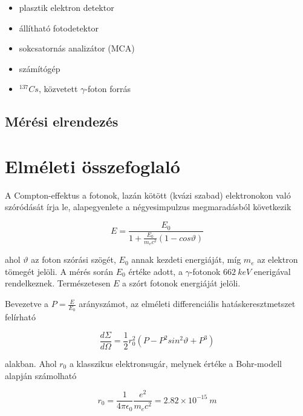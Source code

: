 \documentclass[a4paper,12pt]{article}
\begin{document}
\begin{itemize}
\item plasztik elektron detektor
\item állítható fotodetektor
\item sokcsatornás analizátor (MCA)
\item számítógép
\item $^{137}Cs$, közvetett $\gamma$-foton forrás
\end{itemize}

\subsection{Mérési elrendezés}



\vspace{2cm}

\section{Elméleti összefoglaló}

\par A Compton-effektus a fotonok, lazán kötött (kvázi szabad) elektronokon való szóródását írja le, alapegyenlete a négyesimpulzus megmaradásból következik

\begin{equation*}
	E = \frac{E_{0}}{1 + \frac{E_{0}}{m_{e}c^{2}}(1 - cos\vartheta)}	
\end{equation*}

ahol $\vartheta$ az foton szórási szögét, $E_{0}$ annak kezdeti energiáját, míg $m_{e}$ az elektron tömegét jelöli. A mérés során $E_{0}$ értéke adott, a $\gamma$-fotonok $662~keV$ enerigával rendelkeznek. Természetesen $E$ a szórt fotonok energiáját jelöli.
\par Bevezetve a $P = \frac{E}{E_{0}}$ arányszámot, az elméleti differenciális hatáskeresztmetszet felírható

\begin{equation*}
	\frac{d\Sigma}{d\Omega} = \frac{1}{2}r_{0}^{2}(P - P^{2}sin^{2}\vartheta + P^{3})
\end{equation*}

alakban. Ahol $r_{0}$ a klasszikus elektronsugár, melynek értéke a Bohr-modell alapján számolható

\begin{equation*}
	r_{0} = \frac{1}{4\pi\epsilon_{0}}\frac{e^{2}}{m_{e}c^{2}} = 2.82 \times 10^{-15} ~m
\end{equation*}
\end{document}
